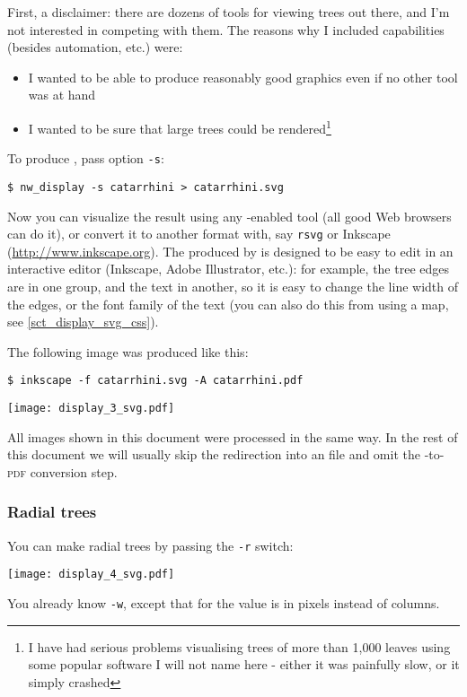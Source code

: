 First, a disclaimer: there are dozens of tools for viewing trees out there, and
I'm not interested in competing with them. The reasons why I included \svg{}
capabilities (besides automation, etc.) were:
\begin{itemize}
\item I wanted to be able to produce reasonably good graphics even if no other
tool was at hand
\item I wanted to be sure that large trees could be rendered\footnote{I have had serious problems
visualising trees of more than 1,000 leaves using some popular software I will
not name here - either it was painfully slow, or it simply crashed}
\end{itemize}
To produce \svg, pass option \texttt{-s}:
\begin{verbatim}
$ nw_display -s catarrhini > catarrhini.svg
\end{verbatim}
Now you can visualize the result using any \svg-enabled tool (all good Web
browsers can do it), or convert it to another format with, say \texttt{rsvg} or
Inkscape (\url{http://www.inkscape.org}).  The \svg{} produced by \display{} is
designed to be easy to edit in an interactive editor (Inkscape, Adobe
Illustrator, etc.): for example, the tree edges are in one group, and the text
in another, so it is easy to change the line width of the edges, or the font
family of the text (you can also do this from \display{} using a \css{} map,
see \ref{sct_display_svg_css}).

The following \pdf{} image was produced like this:

\begin{verbatim}
$ inkscape -f catarrhini.svg -A catarrhini.pdf
\end{verbatim}

\begin{center}
 \texttt{[image: display\_3\_svg.pdf]}
\end{center}
All \svg{} images shown in this document were processed in the same way. In the
rest of this document we will usually skip the redirection into an \svg{} file
and omit the \svg{}-to-\textsc{pdf} conversion step.


\subsubsection{Radial trees}

You can make radial trees by passing the \texttt{-r} switch:

\begin{center}
\texttt{[image: display\_4\_svg.pdf]}
\end{center}
You already know \texttt{-w}, except that for \svg{} the value is in pixels instead of columns. 


